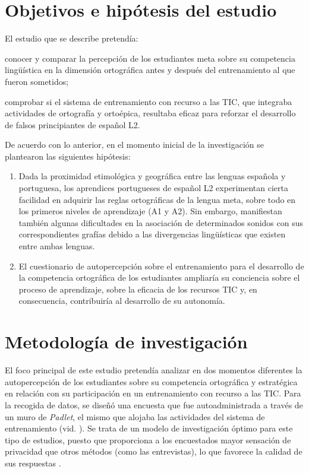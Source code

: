 \documentclass[spanish]{textolivre}
\begin{document}
\section{Objetivos e hipótesis del estudio}\label{sec-formato}
El estudio que se describe pretendía: 
\begin{enumerate*}[label=(\roman*)]
\item conocer y comparar la percepción de los estudiantes meta sobre su competencia lingüística en la dimensión ortográfica antes y después del entrenamiento al que fueron sometidos; 
\item comprobar si el sistema de entrenamiento con recurso a las TIC, que integraba actividades de ortografía y ortoépica, resultaba eficaz para reforzar el desarrollo de falsos principiantes de español L2.
\end{enumerate*}
De acuerdo con lo anterior, en el momento inicial de la investigación se plantearon las siguientes hipótesis:

\begin{enumerate}[label=(\roman*)]
    \item Dada la proximidad etimológica y geográfica entre las lenguas española y portuguesa, los aprendices portugueses de español L2 experimentan cierta facilidad en adquirir las reglas ortográficas de la lengua meta, sobre todo en los primeros niveles de aprendizaje (A1 y A2). Sin embargo, manifiestan también algunas dificultades en la asociación de determinados sonidos con sus correspondientes grafías debido a las divergencias lingüísticas que existen entre ambas lenguas.
    \item El cuestionario de autopercepción sobre el entrenamiento para el desarrollo de la competencia ortográfica de los estudiantes ampliaría su conciencia sobre el proceso de aprendizaje, sobre la eficacia de los recursos TIC y, en consecuencia, contribuiría al desarrollo de su autonomía.
\end{enumerate}

\section{Metodología de investigación}\label{sec-modelo}
El foco principal de este estudio pretendía analizar en dos momentos diferentes la autopercepción de los estudiantes sobre su competencia ortográfica y estratégica en relación con su participación en un entrenamiento con recurso a las TIC.  Para la recogida de datos, se diseñó una encuesta que fue autoadministrada a través de un muro de \textit{Padlet}, el mismo que alojaba las actividades del sistema de entrenamiento (vid. ). Se trata de un modelo de investigación óptimo para este tipo de estudios, puesto que proporciona a los encuestados mayor sensación de privacidad que otros métodos (como las entrevistas), lo que favorece la calidad de sus respuestas \cite{cea_dancona_metodos_2004,fernandez-vazquez_muda_2023}.
\end{document}
